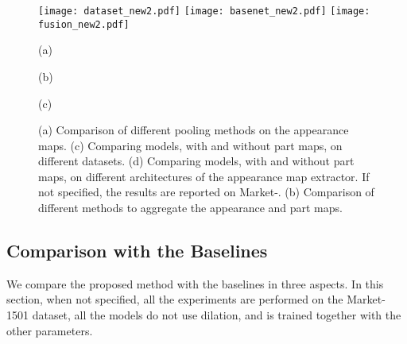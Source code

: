 \documentclass{llncs}
\begin{document}
\begin{figure} [t]
\centering

\small
\texttt{[image: dataset\_new2.pdf]}
\texttt{[image: basenet\_new2.pdf]}
\texttt{[image: fusion\_new2.pdf]}

    \begin{minipage}{0.32\linewidth}
\centering
      \small{(a)}
    \end{minipage}
    \begin{minipage}{0.32\linewidth}
\centering
      \small{(b)}
    \end{minipage}
    \begin{minipage}{0.32\linewidth}
\centering
      \small{(c)}
    \end{minipage}
\vspace{-.3cm}
\caption{
(a) Comparison of different pooling methods on the appearance maps. (c) Comparing models, with and without part maps, on different datasets. (d) Comparing models, with and without part maps, on different architectures of the appearance map extractor. If not specified, the results are reported on Market-. (b) Comparison of different methods to aggregate the appearance and part maps.
}
\label{fig:baseline}
\vspace{-.5cm}
\end{figure}

\subsection{Comparison with the Baselines}
\label{section:comparison_with_baselines}
We compare the proposed method with the baselines in three aspects. In this section, when not specified, all the experiments are performed on the Market-1501 dataset, all the models do not use dilation, and  is trained together with the other parameters.
\end{document}
